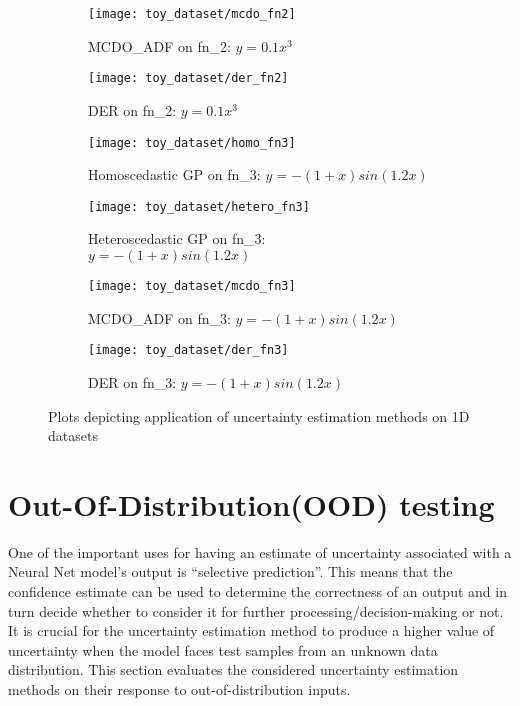 \begin{figure}[H]\ContinuedFloat
	\centering
	\begin{subfigure}[b]{0.4\textwidth}
		\centering
		\texttt{[image: toy\_dataset/mcdo\_fn2]}
		\caption{MCDO\_ADF on fn\_2: $y=0.1x^3$}
		\label{mcdo_fn2}
	\end{subfigure}
	\hfill
	\begin{subfigure}[b]{0.4\textwidth}
		\centering
		\texttt{[image: toy\_dataset/der\_fn2]}
		\caption{DER on fn\_2: $y=0.1x^3$}
		\label{der_fn2}
	\end{subfigure}
	\hfill
	\begin{subfigure}[b]{0.4\textwidth}
		\centering
		\texttt{[image: toy\_dataset/homo\_fn3]}
		\caption{Homoscedastic GP on fn\_3: $y=-(1+x)sin(1.2x)$}
		\label{homo_fn3}
	\end{subfigure}
	\hfill
	\begin{subfigure}[b]{0.4\textwidth}
		\centering
		\texttt{[image: toy\_dataset/hetero\_fn3]}
		\caption{Heteroscedastic GP on fn\_3: $y=-(1+x)sin(1.2x)$}
		\label{hetero_fn3}
	\end{subfigure}
	\hfill
	\begin{subfigure}[b]{0.4\textwidth}
		\centering
		\texttt{[image: toy\_dataset/mcdo\_fn3]}
		\caption{MCDO\_ADF on fn\_3: $y=-(1+x)sin(1.2x)$}
		\label{mcdo_fn3}
	\end{subfigure}
	\hfill
	\begin{subfigure}[b]{0.4\textwidth}
		\centering
		\texttt{[image: toy\_dataset/der\_fn3]}
		\caption{DER on fn\_3: $y=-(1+x)sin(1.2x)$}
		\label{der_fn3}
	\end{subfigure}
	\hfill
	\caption{Plots depicting application of uncertainty estimation methods on 1D datasets}
	\label{fig_1d_functions}
\end{figure}


\section{Out-Of-Distribution(OOD) testing}
One of the important uses for having an estimate of uncertainty associated with a Neural Net model's output is \enquote{selective prediction}. This means that the confidence estimate can be used to determine the correctness of an output and in turn decide whether to consider it for further processing/decision-making or not. It is crucial for the uncertainty estimation method to produce a higher value of uncertainty when the model faces test samples from an unknown data distribution. This section evaluates the considered uncertainty estimation methods on their response to out-of-distribution inputs.
